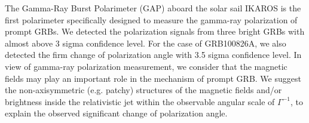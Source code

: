 


\bigskip



\bigskip

\noindent The Gamma-Ray Burst Polarimeter (GAP) aboard the solar sail IKAROS is the first polarimeter specifically designed to measure the gamma-ray polarization of prompt GRBs. We detected the polarization signals from three bright GRBs with almost above 3 sigma confidence level. For the case of GRB100826A, we also detected the firm change of polarization angle with 3.5 sigma confidence level. In view of gamma-ray polarization measurement, we consider that the magnetic fields may play an important role in the mechanism of prompt GRB. We suggest the non-axisymmetric (e.g. patchy) structures of the magnetic fields and/or brightness inside the relativistic jet within the observable angular scale of $\Gamma^{-1}$, to explain the observed significant change of polarization angle.

